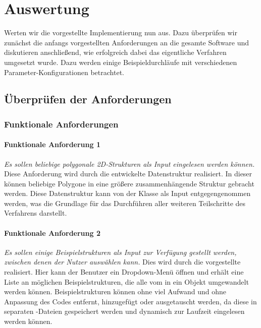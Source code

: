 %
\chapter{Auswertung}
\label{chap:auswertung}
Werten wir die vorgestellte Implementierung nun aus. Dazu überprüfen wir zunächst die anfangs vorgestellten Anforderungen an die gesamte
Software und diskutieren anschließend, wie erfolgreich dabei das eigentliche Verfahren umgesetzt wurde. Dazu werden einige
Beispieldurchläufe mit verschiedenen Parameter-Konfigurationen betrachtet.

\section{Überprüfen der Anforderungen}
\subsection{Funktionale Anforderungen}
\subsubsection{Funktionale Anforderung 1}
\textit{Es sollen beliebige polygonale 2D-Strukturen als Input eingelesen werden können.} Diese Anforderung wird
durch die entwickelte  Datenstruktur realisiert. In dieser können beliebige Polygone in eine größere zusammenhängende
Struktur gebracht werden. Diese Datenstruktur kann von der  Klasse als Input entgegengenommen werden, was die
Grundlage für das Durchführen aller weiteren Teilschritte des Verfahrens darstellt.

\subsubsection{Funktionale Anforderung 2}
\textit{Es sollen einige Beispielstrukturen als Input zur Verfügung gestellt werden, zwischen denen der Nutzer auswählen kann.}
Dies wird durch die vorgestellte  realisiert. Hier kann der Benutzer ein Dropdown-Menü öffnen und erhält eine Liste an
möglichen Beispielstrukturen, die alle vom  in ein  Objekt umgewandelt werden können.
Beispielstrukturen können ohne viel Aufwand und ohne Anpassung des Codes entfernt, hinzugefügt oder ausgetauscht werden, da diese in
separaten -Dateien gespeichert werden und dynamisch zur Laufzeit eingelesen werden können.

